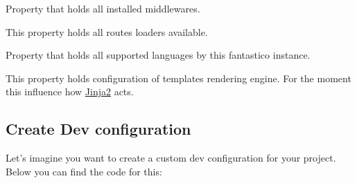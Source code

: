 \documentclass[letterpaper,10pt,english]{sphinxmanual}
\begin{document}
\begin{fulllineitems}
\begin{fulllineitems}
\end{fulllineitems}


\begin{fulllineitems}
\label{get_started/settings:fantastico.settings.BasicSettings.installed_middleware}
Property that holds all installed middlewares.

\end{fulllineitems}


\begin{fulllineitems}
\label{get_started/settings:fantastico.settings.BasicSettings.routes_loaders}
This property holds all routes loaders available.

\end{fulllineitems}


\begin{fulllineitems}
\label{get_started/settings:fantastico.settings.BasicSettings.supported_languages}
Property that holds all supported languages by this fantastico instance.

\end{fulllineitems}


\begin{fulllineitems}
\label{get_started/settings:fantastico.settings.BasicSettings.templates_config}
This property holds configuration of templates rendering engine. For the moment this influence how
\href{http://jinja.pocoo.org/docs/}{Jinja2} acts.

\end{fulllineitems}


\end{fulllineitems}



\subsection{Create Dev configuration}
\label{get_started/settings:create-dev-configuration}
Let's imagine you want to create a custom dev configuration for your project. Below you can find the code for this:
\end{document}
